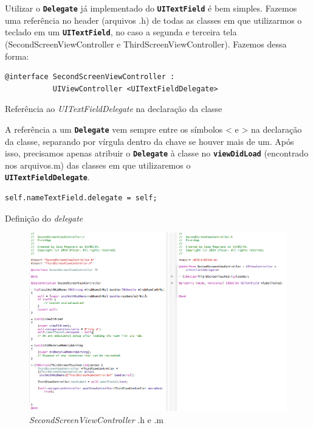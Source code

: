 \documentclass[a4paper,12pt,brazil,doubleside]{book}
\begin{document}
\begin{singlespace}
Utilizar o \texttt{\textbf{Delegate}} já implementado do \texttt{\textbf{UITextField}} é bem simples. Fazemos uma referência no header (arquivos .h) de todas as classes em que utilizarmos o teclado em um \texttt{\textbf{UITextField}}, no caso a segunda e terceira tela (SecondScreenViewController e ThirdScreenViewController). Fazemos dessa forma:

\begin{listing}[H]
\begin{verbatim}
@interface SecondScreenViewController :
           UIViewController <UITextFieldDelegate>
\end{verbatim}
\caption{Referência ao \emph{UITextFieldDelegate} na declaração da classe}
\end{listing}


A referência a um \texttt{\textbf{Delegate}} vem sempre entre os símbolos < e > na declaração da classe, separando por vírgula dentro da chave se houver mais de um. Após isso, precisamos apenas atribuir o \texttt{\textbf{Delegate}} à classe no \texttt{\textbf{viewDidLoad}} (encontrado nos arquivos.m) das classes em que utilizaremos o\\ \texttt{\textbf{UITextFieldDelegate}}.

\begin{listing}[H]
\begin{verbatim}
self.nameTextField.delegate = self;
\end{verbatim}
\caption{Definição do \emph{delegate}}
\end{listing}

\begin{figure}[H]
  \centering
  \includegraphics[width=.99\textwidth]{figuras/3/tela_novo_projeto_48.png}
  \caption{\emph{SecondScreenViewController} .h e .m}
  \label{fig:a}
\end{figure}



\end{singlespace}
\end{document}
